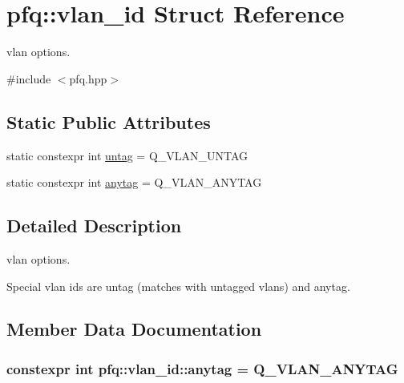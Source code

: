 \hypertarget{structpfq_1_1vlan__id}{}\section{pfq\+:\+:vlan\+\_\+id Struct Reference}
\label{structpfq_1_1vlan__id}


vlan options.  




{\ttfamily \#include $<$pfq.\+hpp$>$}

\subsection*{Static Public Attributes}
\begin{DoxyCompactItemize}
\item 
static constexpr int \hyperlink{structpfq_1_1vlan__id_a9e30bbd86d62e58ae5e5e080f7e046df}{untag} = Q\+\_\+\+V\+L\+A\+N\+\_\+\+U\+N\+T\+AG
\item 
static constexpr int \hyperlink{structpfq_1_1vlan__id_affdae3b855070274e64b5d5696d6d72e}{anytag} = Q\+\_\+\+V\+L\+A\+N\+\_\+\+A\+N\+Y\+T\+AG
\end{DoxyCompactItemize}


\subsection{Detailed Description}
vlan options. 

Special vlan ids are untag (matches with untagged vlans) and anytag. 

\subsection{Member Data Documentation}
\subsubsection[{\texorpdfstring{anytag}{anytag}}]{\setlength{\rightskip}{0pt plus 5cm}constexpr int pfq\+::vlan\+\_\+id\+::anytag = Q\+\_\+\+V\+L\+A\+N\+\_\+\+A\+N\+Y\+T\+AG\hspace{0.3cm}{\ttfamily [static]}}\hypertarget{structpfq_1_1vlan__id_affdae3b855070274e64b5d5696d6d72e}{}\label{structpfq_1_1vlan__id_affdae3b855070274e64b5d5696d6d72e}
